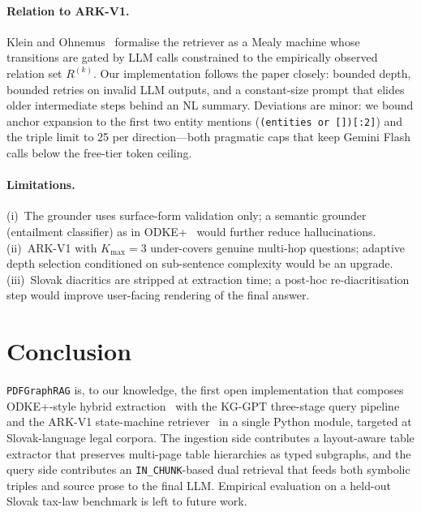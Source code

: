 \documentclass[11pt,a4paper]{article}
\begin{document}
\paragraph{Relation to ARK-V1.}
Klein and Ohnemus~\cite{arkv12025} formalise the retriever as a Mealy machine
whose transitions are gated by LLM calls constrained to the empirically
observed relation set $R^{(k)}$. Our implementation follows the paper
closely: bounded depth, bounded retries on invalid LLM outputs, and a
constant-size prompt that elides older intermediate steps behind an NL
summary. Deviations are minor: we bound anchor expansion to the first two
entity mentions (\texttt{(entities or [])[:2]}) and the triple limit to
25 per direction---both pragmatic caps that keep Gemini Flash calls below
the free-tier token ceiling.

\paragraph{Limitations.}
(i)~The grounder uses surface-form validation only; a semantic grounder
(entailment classifier) as in ODKE+~\cite{odkeplus2025} would further
reduce hallucinations. (ii)~ARK-V1 with $K_{\max}=3$ under-covers genuine
multi-hop questions; adaptive depth selection conditioned on
sub-sentence complexity would be an upgrade. (iii)~Slovak diacritics are
stripped at extraction time; a post-hoc re-diacritisation step would
improve user-facing rendering of the final answer.

\section{Conclusion}

\texttt{PDFGraphRAG} is, to our knowledge, the first open implementation
that composes ODKE+-style hybrid extraction~\cite{odkeplus2025} with the
KG-GPT three-stage query pipeline~\cite{kggpt2023} and the ARK-V1
state-machine retriever~\cite{arkv12025} in a single Python module,
targeted at Slovak-language legal corpora. The ingestion side
contributes a layout-aware table extractor that preserves multi-page
table hierarchies as typed subgraphs, and the query side contributes an
\texttt{IN\_CHUNK}-based dual retrieval that feeds both symbolic triples
and source prose to the final LLM. Empirical evaluation on a held-out
Slovak tax-law benchmark is left to future work.
\end{document}

